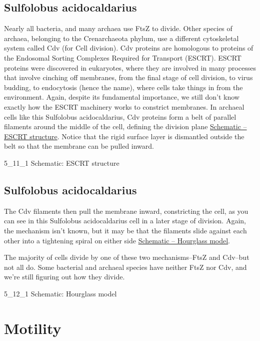\documentclass[]{tufte-book}
\begin{document}
\section{Sulfolobus acidocaldarius}\label{sulfolobus-acidocaldarius}

Nearly all bacteria, and many archaea use FtsZ to divide. Other species
of archaea, belonging to the Crenarchaeota phylum, use a different
cytoskeletal system called Cdv (for Cell division). Cdv proteins are
homologous to proteins of the Endosomal Sorting Complexes Required for
Transport (ESCRT). ESCRT proteins were discovered in eukaryotes, where
they are involved in many processes that involve cinching off membranes,
from the final stage of cell division, to virus budding, to endocytosis
(hence the name), where cells take things in from the environment.
Again, despite its fundamental importance, we still don't know exactly
how the ESCRT machinery works to constrict membranes. In archaeal cells
like this Sulfolobus acidocaldarius, Cdv proteins form a belt of
parallel filaments around the middle of the cell, defining the division
plane \protect\hyperlink{ESCRT_structure}{Schematic -- ESCRT structure}.
Notice that the rigid surface layer is dismantled outside the belt so
that the membrane can be pulled inward.

5\_11\_1 Schematic: ESCRT structure

\section{Sulfolobus acidocaldarius}\label{sulfolobus-acidocaldarius-1}

The Cdv filaments then pull the membrane inward, constricting the cell,
as you can see in this Sulfolobus acidocaldarius cell in a later stage
of division. Again, the mechanism isn't known, but it may be that the
filaments slide against each other into a tightening spiral on either
side \protect\hyperlink{Hourglass_model}{Schematic -- Hourglass model}.

The majority of cells divide by one of these two mechanisms--FtsZ and
Cdv--but not all do. Some bacterial and archaeal species have neither
FtsZ nor Cdv, and we're still figuring out how they divide.

5\_12\_1 Schematic: Hourglass model

\chapter{Motility}\label{motility}
\end{document}
